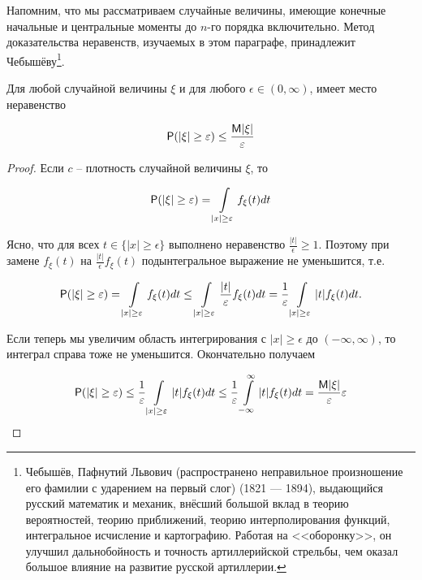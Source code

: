 Напомним, что мы рассматриваем случайные величины, имеющие конечные начальные и центральные моменты до $n$-го порядка включительно.
Метод доказательства неравенств, изучаемых в этом параграфе, принадлежит Чебышёву\footnote{
Чебышёв, Пафнутий Львович (распространено неправильное произношение его фамилии с ударением на первый слог) (1821 — 1894), выдающийся русский математик и механик, внёсший большой вклад
в теорию вероятностей, теорию приближений, теорию интерполирования функций, интегральное исчисление и картографию. Работая на <<оборонку>>, он улучшил дальнобойность и точность артиллерийской
стрельбы, чем оказал большое влияние на развитие русской артиллерии.	
}.

\begin{theorem}
\label{th:20.1}
 Для любой случайной
величины $\xi$ и для любого $\epsilon \in (0, \infty)$, имеет место неравенство

\begin{equation*}
\P( |\xi| \geq \epsilon ) \leq \frac{\M|\xi|}{\epsilon}	
\end{equation*}	
\end{theorem}

\begin{proof}
	Если $c$ -- плотность случайной величины $\xi$, то

\begin{equation*}
	\P( |\xi| \geq \epsilon ) = \int\limits_{|x|\geq \epsilon} f_{\xi}(t)dt
\end{equation*}

Ясно, что для всех $t \in \{ |x| \geq \epsilon \}$ выполнено неравенство $\frac{|t|}{\epsilon} \geq 1$. Поэтому при замене $f_{\xi}(t)$ на $\frac{|t|}{\epsilon} f_{\xi}(t)$ подынтегральное выражение не уменьшится, т.е.

\begin{equation*}
\P( |\xi| \geq \epsilon ) = \int\limits_{|x| \geq \epsilon}f_{\xi}(t)dt \leq \int\limits_{|x| \geq \epsilon} \frac{|t|}{\epsilon} f_{\xi}(t)dt = \frac{1}{\epsilon}\int\limits_{|x| \geq \epsilon} |t|f_{\xi}(t)dt. 
\end{equation*}

Если теперь мы увеличим область интегрирования с ${ |x| \geq \epsilon }$ до $(−\infty, \infty)$,
то интеграл справа тоже не уменьшится. Окончательно получаем

\begin{equation*}
	\P( |\xi| \geq \epsilon ) \leq \frac{1}{\epsilon} \int\limits_{|x| \geq \epsilon} |t|f_{\xi}(t)dt \leq \frac{1}{\epsilon} \int\limits_{-\infty}^{\infty} |t|f_{\xi}(t)dt = \frac{\M|\xi|}{\epsilon}
\epsilon
\end{equation*}
\end{proof}


